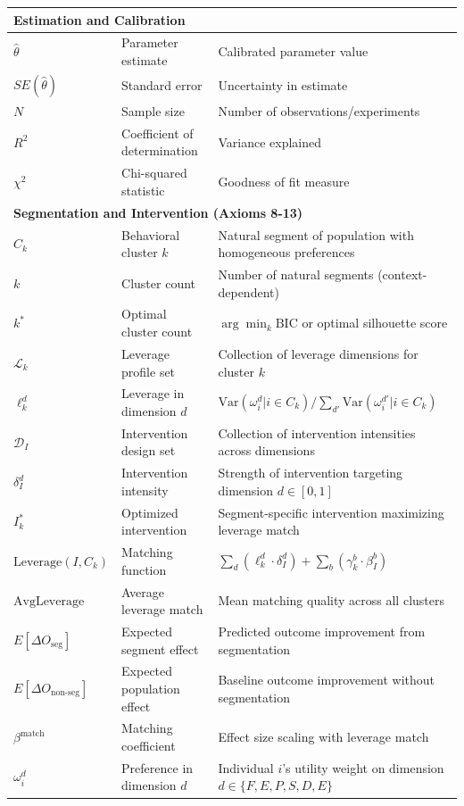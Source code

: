 \begin{center}
\begin{longtable}{lp{4cm}p{7cm}}
\multicolumn{3}{l}{\textbf{Estimation and Calibration}} \\
\hline
$\hat{\theta}$ & Parameter estimate & Calibrated parameter value \\
$SE(\hat{\theta})$ & Standard error & Uncertainty in estimate \\
$N$ & Sample size & Number of observations/experiments \\
$R^2$ & Coefficient of determination & Variance explained \\
$\chi^2$ & Chi-squared statistic & Goodness of fit measure \\
\hline

\multicolumn{3}{l}{\textbf{Segmentation and Intervention (Axioms 8-13)}} \\
\hline
$C_k$ & Behavioral cluster $k$ & Natural segment of population with homogeneous preferences \\
$k$ & Cluster count & Number of natural segments (context-dependent) \\
$k^*$ & Optimal cluster count & $\arg\min_k \text{BIC}$ or optimal silhouette score \\
$\mathcal{L}_k$ & Leverage profile set & Collection of leverage dimensions for cluster $k$ \\
$\ell_k^d$ & Leverage in dimension $d$ & $\text{Var}(\omega_i^d | i \in C_k) / \sum_{d'} \text{Var}(\omega_i^{d'} | i \in C_k)$ \\
$\mathcal{D}_I$ & Intervention design set & Collection of intervention intensities across dimensions \\
$\delta_I^d$ & Intervention intensity & Strength of intervention targeting dimension $d \in [0,1]$ \\
$I^*_k$ & Optimized intervention & Segment-specific intervention maximizing leverage match \\
$\text{Leverage}(I, C_k)$ & Matching function & $\sum_d (\ell_k^d \cdot \delta_I^d) + \sum_b (\gamma_k^b \cdot \beta_I^b)$ \\
$\text{AvgLeverage}$ & Average leverage match & Mean matching quality across all clusters \\
$E[\Delta O_{\text{seg}}]$ & Expected segment effect & Predicted outcome improvement from segmentation \\
$E[\Delta O_{\text{non-seg}}]$ & Expected population effect & Baseline outcome improvement without segmentation \\
$\beta^{\text{match}}$ & Matching coefficient & Effect size scaling with leverage match \\
$\omega_i^d$ & Preference in dimension $d$ & Individual $i$'s utility weight on dimension $d \in \{F,E,P,S,D,E\}$ \\
\hline

\end{longtable}
\end{center}

